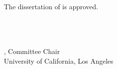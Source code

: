 \newpage
The dissertation of  is approved.

\begin{center}
\\
\\
\\
, Committee Chair\\[50pt]

University of California, Los Angeles\\
\end{center}